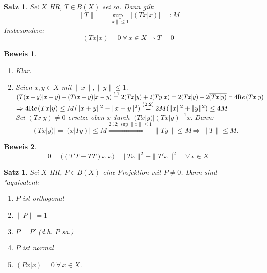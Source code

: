 \documentclass[a4paper,11pt]{book}
\newcommand{\R}{{\mathbb R}}
\newcommand{\re}{\ensuremath{\text Re}\,}
\newtheorem{Sa}[Def]{Satz}
\theoremstyle{nonumberplain}
\newtheorem{Bew}{Beweis}
\begin{document}


\begin{Sa}
Sei $X$ HR, $T \in B(X)$ sei sa. Dann gilt:
\[
\| T \| = \sup_{\|x\| \leq 1} \left| (Tx|x) \right| =: M
\]
Insbesondere:
\[
(Tx|x) = 0 \ \forall\, x \in X \Rightarrow T = 0
\]
\end{Sa}

\begin{Bew}
\begin{enumerate}
\item["` $\geq$ "´] Klar.

\item["` $\leq$ "´] Seien $x,y \in X$ mit $\|x\|,\|y\| .$\\
$(T(x+y)|x+y) - (T(x-y)|x-y)  2(Tx|y) + 2(Ty|x) = 2(Tx|y) + 2  = 4 \re (Tx|y)$\\
$ \re (Tx|y) \leq M( \|x+y\|^2 - \|x-y\|^2)  2M(\|x\|^2 + \|y\|^2) \leq 4M$\\
Sei $(Tx|y) $ ersetze oben $x$ durch $|(Tx|y)|(Tx|y)^{-1}x$. Dann:
\[
|(Tx|y)| = |(x|Ty)| \leq M \stackrel{2.12; \sup \|x\| \leq 1}{\Longrightarrow} \|Ty\| \leq M \Longrightarrow \|T\| \leq M.
\]
\end{enumerate}
\end{Bew}



\begin{Bew}
\[
0 = ((T'T-TT)x|x) = |\ Tx \|^2 - \| T'x \|^2 \quad \forall\, x \in X
\]
\end{Bew}


\begin{Sa}
Sei $X$ HR, $P \in B(X)$ eine Projektion mit $P \not= 0$. Dann sind "aquivalent:
\begin{enumerate}
\item[a)] $P$ ist orthogonal

\item[b)] $\|P\| = 1$

\item[c)] $P = P'$ (d.h. $P$ sa.)

\item[d)] $P$ ist normal

\item[e)] $(Px|x) = 0 \ \forall\, x \in X$.
\end{enumerate}
\end{Sa}
\end{document}
